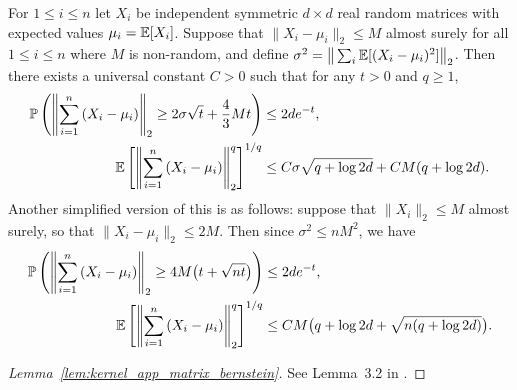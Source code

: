 \begin{lemma}
  \label{lem:kernel_app_matrix_bernstein}

  For $1 \leq i \leq n$
  let $X_i$ be independent symmetric $d \times d$
  real random matrices
  with expected values $\mu_i = \mathbb{E}[X_i]$.
  Suppose that
  $\|X_i - \mu_i\|_2 \leq M$
  almost surely for all $1 \leq i \leq n$
  where $M$ is non-random, and define
  $\sigma^2 = \big\| \sum_i \mathbb{E}[(X_i - \mu_i)^2] \big\|_2$.
  Then there exists a universal constant $C > 0$
  such that
  for any $t > 0$ and $q \geq 1$,
  \begin{align*}
    \mathbb{P}\left(
      \left\|
      \sum_{i=1}^n
      \left(
        X_i - \mu_i
      \right)
      \right\|_2
      \geq
      2 \sigma \sqrt{t}
      + \frac{4}{3} M t
    \right)
    &\leq
    2 d e^{-t}, \\
    \mathbb{E}\left[
      \left\|
      \sum_{i=1}^n
      \left(
        X_i - \mu_i
      \right)
      \right\|_2^q
    \right]^{1/q}
    &\leq
    C \sigma \sqrt{q + \log 2d}
    + C M (q + \log 2d).
  \end{align*}
  Another simplified version of this is as follows:
  suppose that
  $\|X_i\|_2 \leq M$ almost surely,
  so that
  $\|X_i - \mu_i\|_2 \leq 2M$.
  Then since
  $\sigma^2 \leq n M^2$,
  we have
  \begin{align*}
    \mathbb{P}\left(
      \left\|
      \sum_{i=1}^n
      \left(
        X_i - \mu_i
      \right)
      \right\|_2
      \geq
      4M \big(t + \sqrt{n t}\big)
    \right)
    &\leq
    2 d e^{-t}, \\
    \mathbb{E}\left[
      \left\|
      \sum_{i=1}^n
      \left(
        X_i - \mu_i
      \right)
      \right\|_2^q
    \right]^{1/q}
    &\leq
    C M
    \big(q + \log 2d + \sqrt{n(q + \log 2d)}\big).
  \end{align*}

\end{lemma}

\begin{proof}[Lemma~\ref{lem:kernel_app_matrix_bernstein}]

  See Lemma~3.2 in \citet{minsker2019moment}.
\end{proof}

